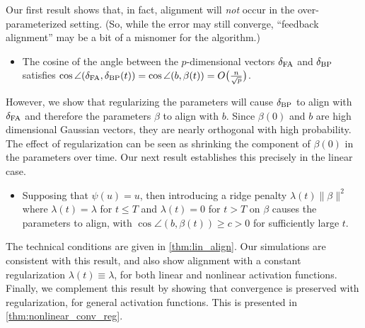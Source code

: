 Our first result shows that, in fact, alignment will \textit{not} occur in the over-parameterized setting. (So, while the error may still converge, ``feedback alignment'' may be a bit of a misnomer for the algorithm.)
\begin{itemize}
\item The cosine of the angle between
the $p$-dimensional vectors $\delta_\mathrm{FA}$ and $\delta_\mathrm{BP}$ satisfies $
\cos\angle(\delta_\mathrm{FA}, \delta_\mathrm{BP}(t)) = \cos\angle(b, \beta(t)) = O\big(\frac{n}{\sqrt p}\big)$.

\end{itemize}
 However, we show that regularizing the parameters will cause
 $\delta_\mathrm{BP}$ to align with $\delta_\mathrm{FA}$ and therefore the parameters $\beta$ to align with $b$. Since $\beta(0)$ and $b$ are high dimensional Gaussian vectors, they are nearly orthogonal with high probability. The effect of regularization can be seen as shrinking the component of $\beta(0)$ in the parameters over time.  Our next result establishes this precisely in the linear case.
\begin{itemize}
\item Supposing that $\psi(u)=u$, then introducing a ridge penalty $\lambda(t) \|\beta\|^2$ where $\lambda(t) = \lambda$ for $t\leq T$ and $\lambda(t) = 0$ for $t > T$
on $\beta$  causes the parameters to align, with $\cos\angle(b, \beta(t)) \geq c > 0$ for sufficiently large $t$.
\end{itemize}
The technical conditions are given in \cref{thm:lin_align}.
Our simulations are consistent with this result, and also show alignment with a constant regularization $\lambda(t)\equiv \lambda$, for both linear and nonlinear activation functions. Finally, we complement this result by showing that convergence is preserved with regularization, for general activation functions. This is presented in \cref{thm:nonlinear_conv_reg}.

